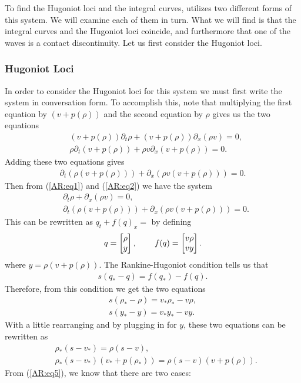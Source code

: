 \documentclass{article}
\begin{document}
To find the Hugoniot loci and the integral curves, \cite{AwRascle2000} utilizes two different forms of this system. 
We will examine each of them in turn. What we will find is that the integral curves and the Hugoniot loci coincide, 
and furthermore that one of the waves is a contact discontinuity. Let us first consider the Hugoniot loci. 

\subsubsection{Hugoniot Loci}
In order to consider the Hugoniot loci for this system we must first write the system in conversation form. 
To accomplish this, note that multiplying the first equation by $(v + p(\rho ))$ and the second equation 
by $\rho$ gives us the two equations 
\begin{align*}
&(v + p(\rho ))\partial_t\rho + (v + p(\rho ))\partial_x(\rho v) = 0,  \\
&\rho\partial_t \left(v + p(\rho )\right) + \rho v\partial_x \left( v + p(\rho )\right) = 0.
\end{align*}
Adding these two equations gives
\begin{align}\label{AR:eq2}
\partial_t \left(\rho\left(v + p(\rho )\right)\right) + \partial_x \left( \rho v\left(v + p(\rho )\right)\right) = 0.
\end{align}
Then from (\ref{AR:eq1}) and (\ref{AR:eq2}) we have the system 
\begin{align*}
&\partial_t\rho + \partial_x(\rho v) = 0, \\
&\partial_t \left(\rho\left(v + p(\rho )\right)\right) + \partial_x \left( \rho v\left(v + p(\rho )\right)\right) = 0.
\end{align*}
This can be rewritten as $q_t + f(q)_x = $ by defining
\begin{align*}
q = \left[ \begin{matrix}
\rho \\ y
\end{matrix}\right], \hspace{0.3in}
f(q) = \left[ \begin{matrix}
v\rho \\
vy
\end{matrix}\right].
\end{align*}
where $y = \rho\left(v + p(\rho )\right)$.
The Rankine-Hugoniot condition tells us that 
\begin{align*}
s(q_*- q) = f(q_*) - f(q).
\end{align*}
Therefore, from this condition we get the two equations
\begin{align}
s(\rho_* - \rho) = v_*\rho_* - v\rho, \label{AR:eq3}\\
s(y_* - y) = v_*y_* - vy.\label{AR:eq4}
\end{align}
With a little rearranging and by plugging in for $y$, these two equations can be rewritten as
\begin{align}
&\rho_*(s - v_*) = \rho (s - v), \label{AR:eq5}\\
&\rho_*(s - v_*)\left(v_* + p(\rho_* )\right) = \rho(s - v)\left(v + p(\rho )\right).\label{AR:eq6}
\end{align}
From (\ref{AR:eq5}), we know that there are two cases: 
\end{document}
